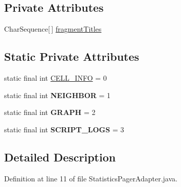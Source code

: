\subsection*{Private Attributes}
\begin{DoxyCompactItemize}
\item 
Char\-Sequence\mbox{[}$\,$\mbox{]} \hyperlink{classcom_1_1qualoutdoor_1_1recorder_1_1statistics_1_1StatisticsPagerAdapter_a1cc9fe41e3f21712e228dfff867910ef}{fragment\-Titles}
\end{DoxyCompactItemize}
\subsection*{Static Private Attributes}
\begin{DoxyCompactItemize}
\item 
static final int \hyperlink{classcom_1_1qualoutdoor_1_1recorder_1_1statistics_1_1StatisticsPagerAdapter_ab2945fd8047171f62d7424d3e8c40b9b}{C\-E\-L\-L\-\_\-\-I\-N\-F\-O} = 0
\item 
\hypertarget{classcom_1_1qualoutdoor_1_1recorder_1_1statistics_1_1StatisticsPagerAdapter_a0129f5c8b0e2921643fcc7a331d25062}{static final int {\bfseries N\-E\-I\-G\-H\-B\-O\-R} = 1}\label{classcom_1_1qualoutdoor_1_1recorder_1_1statistics_1_1StatisticsPagerAdapter_a0129f5c8b0e2921643fcc7a331d25062}

\item 
\hypertarget{classcom_1_1qualoutdoor_1_1recorder_1_1statistics_1_1StatisticsPagerAdapter_a379ae4d8a688ca9eb90dd1694a64bcc3}{static final int {\bfseries G\-R\-A\-P\-H} = 2}\label{classcom_1_1qualoutdoor_1_1recorder_1_1statistics_1_1StatisticsPagerAdapter_a379ae4d8a688ca9eb90dd1694a64bcc3}

\item 
\hypertarget{classcom_1_1qualoutdoor_1_1recorder_1_1statistics_1_1StatisticsPagerAdapter_adae954e09edc2214d375a1b0c6dd2455}{static final int {\bfseries S\-C\-R\-I\-P\-T\-\_\-\-L\-O\-G\-S} = 3}\label{classcom_1_1qualoutdoor_1_1recorder_1_1statistics_1_1StatisticsPagerAdapter_adae954e09edc2214d375a1b0c6dd2455}

\end{DoxyCompactItemize}


\subsection{Detailed Description}


Definition at line 11 of file Statistics\-Pager\-Adapter.\-java.



